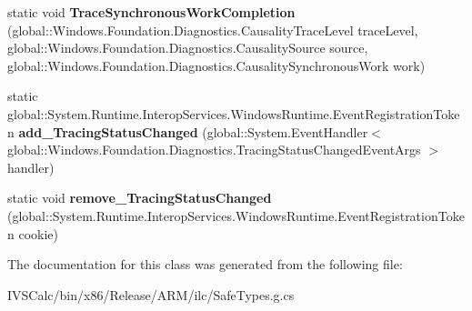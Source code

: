 \begin{DoxyCompactItemize}
\item 
\mbox{\label{class_windows_1_1_foundation_1_1_diagnostics_1_1_async_causality_tracer_a0fdd51a55dbceaaf56df6af1635b618f}} 
static void {\bfseries Trace\+Synchronous\+Work\+Completion} (global\+::\+Windows.\+Foundation.\+Diagnostics.\+Causality\+Trace\+Level trace\+Level, global\+::\+Windows.\+Foundation.\+Diagnostics.\+Causality\+Source source, global\+::\+Windows.\+Foundation.\+Diagnostics.\+Causality\+Synchronous\+Work work)
\item 
\mbox{\label{class_windows_1_1_foundation_1_1_diagnostics_1_1_async_causality_tracer_a25cca79b997614c5cff342a6177b0cc7}} 
static global\+::\+System.\+Runtime.\+Interop\+Services.\+Windows\+Runtime.\+Event\+Registration\+Token {\bfseries add\+\_\+\+Tracing\+Status\+Changed} (global\+::\+System.\+Event\+Handler$<$ global\+::\+Windows.\+Foundation.\+Diagnostics.\+Tracing\+Status\+Changed\+Event\+Args $>$ handler)
\item 
\mbox{\label{class_windows_1_1_foundation_1_1_diagnostics_1_1_async_causality_tracer_abdb7cc6e31beb6735567af4b413f9eea}} 
static void {\bfseries remove\+\_\+\+Tracing\+Status\+Changed} (global\+::\+System.\+Runtime.\+Interop\+Services.\+Windows\+Runtime.\+Event\+Registration\+Token cookie)
\end{DoxyCompactItemize}


The documentation for this class was generated from the following file\+:\begin{DoxyCompactItemize}
\item 
I\+V\+S\+Calc/bin/x86/\+Release/\+A\+R\+M/ilc/Safe\+Types.\+g.\+cs\end{DoxyCompactItemize}

